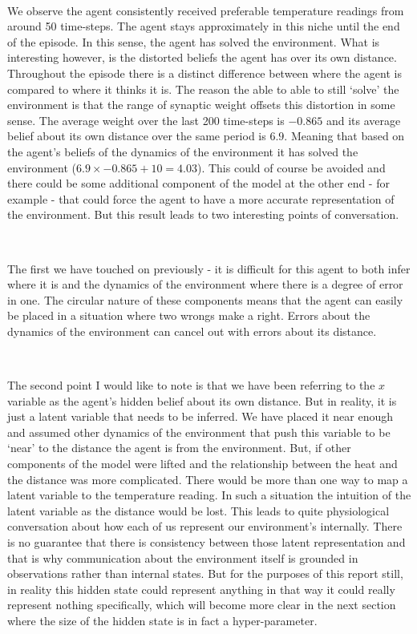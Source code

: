\documentclass{article}
\begin{document}
\

We observe the agent consistently received preferable temperature readings from around 50 time-steps. The agent stays approximately in this niche until the end of the episode. In this sense, the agent has solved the environment. What is interesting however, is the distorted beliefs the agent has over its own distance. Throughout the episode there is a distinct difference between where the agent is compared to where it thinks it is. The reason the able to able to still `solve' the environment is that the range of synaptic weight offsets this distortion in some sense. The average weight over the last 200 time-steps is $-0.865$ and its average belief about its own distance over the same period is $6.9$. Meaning that based on the agent's beliefs of the dynamics of the environment it has solved the environment ($6.9 \times -0.865 + 10 = 4.03$). This could of course be avoided and there could be some additional component of the model at the other end - for example - that could force the agent to have a more accurate representation of the environment. But this result leads to two interesting points of conversation. 

\

The first we have touched on previously - it is difficult for this agent to both infer where it is and the dynamics of the environment where there is a degree of error in one. The circular nature of these components means that the agent can easily be placed in a situation where two wrongs make a right. Errors about the dynamics of the environment can cancel out with errors about its distance.

\

The second point I would like to note is that we have been referring to the $x$ variable as the agent's hidden belief about its own distance. But in reality, it is just a latent variable that needs to be inferred. We have placed it near enough and assumed other dynamics of the environment that push this variable to be `near' to the distance the agent is from the environment. But, if other components of the model were lifted and the relationship between the heat and the distance was more complicated. There would be more than one way to map a latent variable to the temperature reading. In such a situation the intuition of the latent variable as the distance would be lost. This leads to quite physiological conversation about how each of us represent our environment's internally. There is no guarantee that there is consistency between those latent representation and that is why communication about the environment itself is grounded in observations rather than internal states. But for the purposes of this report still, in reality this hidden state could represent anything in that way it could really represent nothing specifically, which will become more clear in the next section where the size of the hidden state is in fact a hyper-parameter. 
\end{document}
